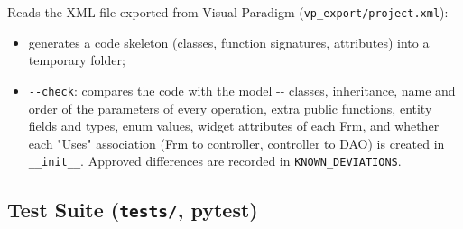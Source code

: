 Reads the XML file exported from Visual Paradigm
(\texttt{vp\_\allowbreak{}export/\allowbreak{}project.\allowbreak{}xml}):

\begin{itemize}
\tightlist
\item
  generates a code skeleton (classes, function signatures, attributes)
  into a temporary folder;
\item
  \texttt{-\/\allowbreak{}-check}: compares the code with the model -\/- classes,
  inheritance, name and order of the parameters of every operation,
  extra public functions, entity fields and types, enum values, widget
  attributes of each Frm, and whether each "Uses" association (Frm to
  controller, controller to DAO) is created in \texttt{\_\allowbreak{}\_\allowbreak{}init\_\allowbreak{}\_\allowbreak{}}.
  Approved differences are recorded in \texttt{KNOWN\_\allowbreak{}DEVIATIONS}.
\end{itemize}

\hypertarget{test-suite-tests-pytest}{%
\subsection{\texorpdfstring{Test Suite (\texttt{tests/\allowbreak{}},
pytest)}{Test Suite (tests/, pytest)}}\label{test-suite-tests-pytest}}

